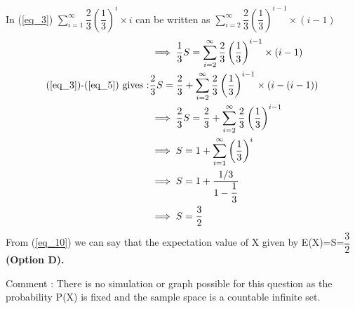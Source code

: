 \documentclass[a4paper]{article}
\begin{document}
\begin{multicols*}{2}
In (\ref{eq_3})	$\sum_{i=1}^{\infty} \dfrac{2}{3}\left(\dfrac{1}{3}\right)^{i} \times i$ can be written as $\sum_{i=2}^{\infty} \dfrac{2}{3}\left(\dfrac{1}{3}\right)^{i-1} \times (i-1)$
\begin{align}
& \implies \dfrac{1}{3}S=\sum_{i=2}^{\infty} \dfrac{2}{3}\left(\dfrac{1}{3}\right)^{i-1} \times (i-1) \label{eq_5} \\
\text{(\ref{eq_3})-(\ref{eq_5}) gives :}& \dfrac{2}{3}S=\dfrac{2}{3}+\sum_{i=2}^{\infty} \dfrac{2}{3}\left(\dfrac{1}{3}\right)^{i-1} \times (i-(i-1))\\
&\implies  \dfrac{2}{3}S=\dfrac{2}{3}+\sum_{i=2}^{\infty} \dfrac{2}{3}\left(\dfrac{1}{3}\right)^{i-1}\\
& \implies S=1+\sum_{i=1}^{\infty}\left(\dfrac{1}{3}\right)^{i}\\
& \implies S=1+\dfrac{1/3}{1-\dfrac{1}{3}}\\
& \implies S=\dfrac{3}{2} \label{eq_10}
\end{align}
From (\ref{eq_10}) we can say that the expectation value of X given by E(X)=S=$\dfrac{3}{2}$		
\textbf{(Option D).}

\vspace{3 cm}
Comment : There is no simulation or graph possible for this question as the probability P(X) is fixed and the sample space is a countable infinite set.


\end{multicols*}
\end{document}
